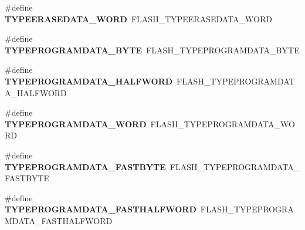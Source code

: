 \begin{DoxyCompactItemize}
\item 
\mbox{\label{group___h_a_l___f_l_a_s_h___aliased___defines_gaf4f4f8533550f97be0c26f73d57c7287}} 
\#define {\bfseries T\+Y\+P\+E\+E\+R\+A\+S\+E\+D\+A\+T\+A\+\_\+\+W\+O\+RD}~F\+L\+A\+S\+H\+\_\+\+T\+Y\+P\+E\+E\+R\+A\+S\+E\+D\+A\+T\+A\+\_\+\+W\+O\+RD
\item 
\mbox{\label{group___h_a_l___f_l_a_s_h___aliased___defines_ga6864697548b848a7fc44453e1a2fb81c}} 
\#define {\bfseries T\+Y\+P\+E\+P\+R\+O\+G\+R\+A\+M\+D\+A\+T\+A\+\_\+\+B\+Y\+TE}~F\+L\+A\+S\+H\+\_\+\+T\+Y\+P\+E\+P\+R\+O\+G\+R\+A\+M\+D\+A\+T\+A\+\_\+\+B\+Y\+TE
\item 
\mbox{\label{group___h_a_l___f_l_a_s_h___aliased___defines_ga0064d23e04c71357067fc6d55c4ef2d1}} 
\#define {\bfseries T\+Y\+P\+E\+P\+R\+O\+G\+R\+A\+M\+D\+A\+T\+A\+\_\+\+H\+A\+L\+F\+W\+O\+RD}~F\+L\+A\+S\+H\+\_\+\+T\+Y\+P\+E\+P\+R\+O\+G\+R\+A\+M\+D\+A\+T\+A\+\_\+\+H\+A\+L\+F\+W\+O\+RD
\item 
\mbox{\label{group___h_a_l___f_l_a_s_h___aliased___defines_ga97f70e9304478e184521f9e9e209fb38}} 
\#define {\bfseries T\+Y\+P\+E\+P\+R\+O\+G\+R\+A\+M\+D\+A\+T\+A\+\_\+\+W\+O\+RD}~F\+L\+A\+S\+H\+\_\+\+T\+Y\+P\+E\+P\+R\+O\+G\+R\+A\+M\+D\+A\+T\+A\+\_\+\+W\+O\+RD
\item 
\mbox{\label{group___h_a_l___f_l_a_s_h___aliased___defines_gabe017e7fb8bbfcb3e2c085ec36a74413}} 
\#define {\bfseries T\+Y\+P\+E\+P\+R\+O\+G\+R\+A\+M\+D\+A\+T\+A\+\_\+\+F\+A\+S\+T\+B\+Y\+TE}~F\+L\+A\+S\+H\+\_\+\+T\+Y\+P\+E\+P\+R\+O\+G\+R\+A\+M\+D\+A\+T\+A\+\_\+\+F\+A\+S\+T\+B\+Y\+TE
\item 
\mbox{\label{group___h_a_l___f_l_a_s_h___aliased___defines_gaa7602be5fde7d3dfbc33cd647ade049f}} 
\#define {\bfseries T\+Y\+P\+E\+P\+R\+O\+G\+R\+A\+M\+D\+A\+T\+A\+\_\+\+F\+A\+S\+T\+H\+A\+L\+F\+W\+O\+RD}~F\+L\+A\+S\+H\+\_\+\+T\+Y\+P\+E\+P\+R\+O\+G\+R\+A\+M\+D\+A\+T\+A\+\_\+\+F\+A\+S\+T\+H\+A\+L\+F\+W\+O\+RD
\item 
\mbox{\label{group___h_a_l___f_l_a_s_h___aliased___defines_ga871de63c00336d70644a300bc2a67f01}} 

\end{DoxyCompactItemize}
